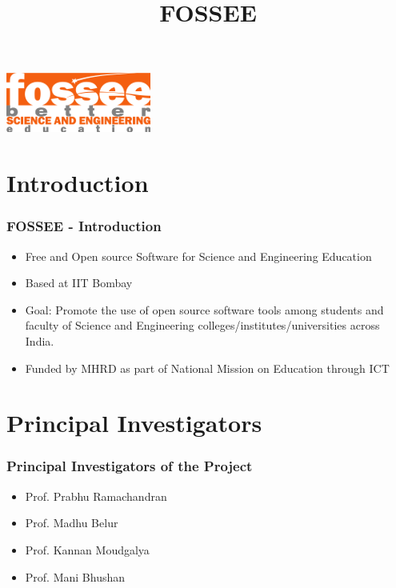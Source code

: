 \documentclass{beamer}
\title{FOSSEE}
\institute[IIT Bombay] {IIT Bombay}
\date{}
\begin{document}
\begin{frame}
   \begin{center}
   \includegraphics[scale=2]{fossee.png}    
   \vspace{1cm}
   \maketitle
   \end{center}  
\end{frame}


\section{Introduction}
\begin{frame}
  \frametitle{{FOSSEE} - Introduction}
  \begin{itemize}
  \item Free and Open source Software for Science and Engineering Education 
  \item Based at IIT Bombay
  \item Goal: Promote the use of open source software tools among students and faculty of Science and Engineering colleges/institutes/universities across India.
  \item Funded by MHRD as part of National Mission on Education through ICT
  \end{itemize}  
\end{frame}

\section{Principal Investigators}
\begin{frame}
  \frametitle{Principal Investigators of the Project}
  \begin{itemize}
  \item Prof. Prabhu Ramachandran
  \item Prof. Madhu Belur
  \item Prof. Kannan Moudgalya
  \item Prof. Mani Bhushan
  \end{itemize}
\end{frame}
\end{document}
